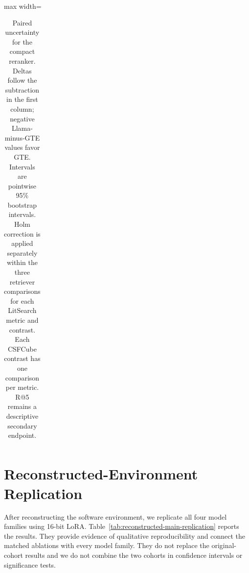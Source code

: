 \documentclass[pdflatex,sn-basic,Numbered]{sn-jnl}%
\theoremstyle{thmstyleone}%
\theoremstyle{thmstyletwo}%
\theoremstyle{thmstylethree}%
\begin{document}
\begin{table}[htbp]
\begin{adjustbox}{max width=\linewidth}
\begin{tabular}{l l l r c c c}
\end{tabular}

\end{adjustbox}


\caption{Paired uncertainty for the compact reranker. Deltas follow the
subtraction in the first column; negative Llama-minus-GTE values favor GTE.
Intervals are pointwise 95\% bootstrap intervals. Holm correction is applied
separately within the three retriever comparisons for each LitSearch metric and
contrast. Each CSFCube contrast has one comparison per metric. R@5 remains a
descriptive secondary endpoint.}
\label{tab:compact-uncertainty}
\end{table}

\FloatBarrier
\section{Reconstructed-Environment Replication}
\label{app:reconstructed-replication}

After reconstructing the software environment, we replicate all four model
families using 16-bit LoRA. Table~\ref{tab:reconstructed-main-replication} reports
the results. They provide evidence of qualitative reproducibility and connect the
matched ablations with every model family. They do not replace the
original-cohort results and we do not combine the two cohorts in confidence
intervals or significance tests.
\end{document}
